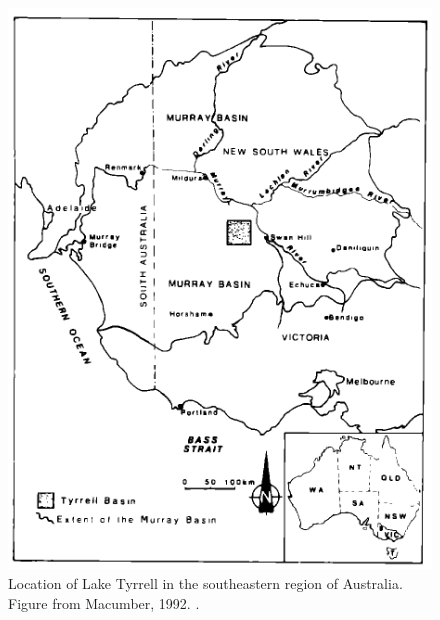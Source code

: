 \begin{figure}[!htbp]
	\centering
	\includegraphics[width=\textwidth]{Chapter1/Figures/LT_Map.pdf}
	\caption{Location of Lake Tyrrell in the southeastern region of Australia. Figure from Macumber, 1992. \cite{Macumber:1992ty}.}
	\label{LT_map}
\end{figure}




%
%
%



